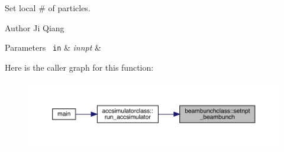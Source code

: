 Set local \# of particles. 

\begin{DoxyAuthor}{Author}
Ji Qiang 
\end{DoxyAuthor}

\begin{DoxyParams}[1]{Parameters}
\mbox{\texttt{ in}}  & {\em innpt} & \\
\hline
\end{DoxyParams}
Here is the caller graph for this function\+:\nopagebreak
\begin{figure}[H]
\begin{center}
\leavevmode
\includegraphics[width=350pt]{namespacebeambunchclass_af1b14b706bd1283ff6c5a7cec4b06c48_icgraph}
\end{center}
\end{figure}
